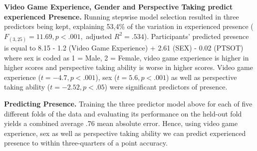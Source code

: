 \indent \textbf{Video Game Experience, Gender and Perspective Taking predict experienced Presence.} Running stepwise model selection resulted in three predictors being kept, explaining 53,4\% of the variation in experienced presence ($F_{(3,25)}=11.69, p < .001,$ adjusted $R^2=.534$). Participants' predicted presence is equal to 8.15 - 1.2 (Video Game Experience) + 2.61 (SEX) - 0.02 (PTSOT) where sex is coded as 1 = Male, 2 = Female, video game experience is higher in higher scores and perspective taking ability is worse in higher scores. Video game experience ($t=-4.7, p<.001$), sex ($t=5.6, p<.001$) as well as perspective taking ability ($t=-2.52, p<.05$) were significant predictors of presence.

\indent \textbf{Predicting Presence.} Training the three predictor model above for each of five different folds of the data and evaluating its performance on the held-out fold yields a combined average .76 mean absolute error. Hence, using video game experience, sex as well as perspective taking ability we can predict experienced presence to within three-quarters of a point accuracy.